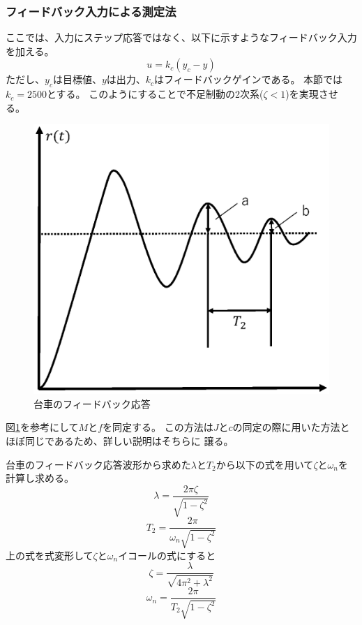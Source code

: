 	\subsubsection{フィードバック入力による測定法}
		ここでは、入力にステップ応答ではなく、以下に示すようなフィードバック入力を加える。
		\begin{equation}
			u = k_{c}(y_{c} - y)
		\end{equation}
		ただし、$y_c$は目標値、$y$は出力、$k_{c}$はフィードバックゲインである。
		本節では$k_c=2500$とする。
		このようにすることで不足制動の2次系($\zeta<1$)を実現させる。
		\begin{figure}[H]
			\centering
			\includegraphics[width=0.6\linewidth]{gazo/feedback.eps}
			\caption{台車のフィードバック応答}
			\label{image:parameterMFfeed}
		\end{figure}
		図\ref{image:parameterMFfeed}を参考にして$M$と$f$を同定する。
		この方法は$J$と$c$の同定の際に用いた方法とほぼ同じであるため、詳しい説明はそちらに
		譲る。
		\par
		台車のフィードバック応答波形から求めた$\lambda$と$T_2$から以下の式を用いて$\zeta$と$\omega_{n}$を計算し求める。
		\begin{equation}
			\lambda=\frac{2\pi\zeta}{\sqrt{1-\zeta^{2}}}
		\end{equation}
		\begin{equation}
			T_{2}=\frac{2\pi}{\omega_{n}\sqrt{1-\zeta^{2}}}
		\end{equation}
		上の式を式変形して$\zeta$と$\omega_{n}$イコールの式にすると
		\begin{equation}
			\zeta=\frac{\lambda}{\sqrt{4\pi^{2}+\lambda^{2}}}
		\end{equation}
		\begin{equation}
			\omega_{n}=\frac{2\pi}{T_{2}\sqrt{1-\zeta^{2}}}
		\end{equation}
